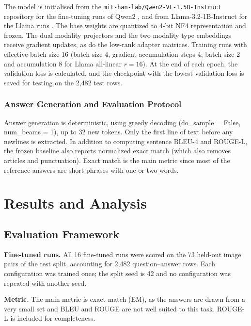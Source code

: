 \documentclass[conference]{IEEEtran}
\begin{document}
The model is initialised from the \texttt{mit-han-lab/Qwen2-VL-1.5B-Instruct} repository for the fine-tuning runs of Qwen2 \cite{mithan}, and from Llama-3.2-1B-Instruct for the Llama runs \cite{llama32}.
The base weights are quantized to 4-bit NF4 representation and frozen. The dual modality projectors and the two modality type embeddings receive gradient updates, as do the low-rank adapter matrices. Training runs with effective batch size 16 (batch size 4, gradient accumulation steps 4; batch size 2 and accumulation 8 for Llama all-linear $r{=}16$). At the end of each epoch, the validation loss is calculated, and the checkpoint with the lowest validation loss is saved for testing on the 2,482 test rows.

\subsubsection{Answer Generation and Evaluation Protocol}

Answer generation is deterministic, using greedy decoding (do\_sample = False, num\_beams = 1), up to 32 new tokens. Only the first line of text before any newlines is extracted. In addition to computing sentence BLEU-4 and ROUGE-L, the frozen baseline also reports normalized exact match (which also removes articles and punctuation). Exact match is the main metric since most of the reference answers are short phrases with one or two words.

\section{Results and Analysis}

\subsection{Evaluation Framework}\label{sec:evalsetup}

\textbf{Fine-tuned runs.} All 16 fine-tuned runs were scored on the 73 held-out image pairs of the test split, accounting for 2,482 question--answer rows. Each configuration was trained once; the split seed is 42 and no configuration was repeated with another seed.

\textbf{Metric.} The main metric is exact match (EM), as the answers are drawn from a very small set and BLEU and ROUGE are not well suited to this task. ROUGE-L is included for completeness.
\end{document}
